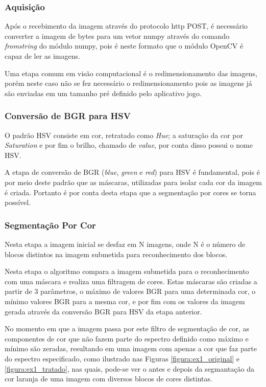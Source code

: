     \subsubsection{Aquisição}
    
    Após o recebimento da imagem através do protocolo http POST, é necessário converter a imagem de bytes para um vetor numpy através do comando \textit{fromstring} do módulo numpy, pois é neste formato que o módulo OpenCV é capaz de ler as imagens. 
    
    Uma etapa comum em visão computacional é o redimensionamento  das imagens, porém neste caso não se fez necessário o redimensionamento pois as imagens já são enviadas em um tamanho pré definido pelo aplicativo jogo.

    \subsubsection{Conversão de BGR para HSV}
    O padrão HSV consiste em cor, retratado como \textit{Hue}; a saturação da cor por \textit{Saturation} e por fim o brilho, chamado de \textit{value}, por conta disso possui o nome HSV.
    
    A etapa de conversão de BGR (\textit{blue}, \textit{green} e \textit{red}) para HSV é fundamental, pois é por meio deste padrão que as máscaras, utilizadas para isolar cada cor da imagem é criada. Portanto é por conta desta etapa que a segmentação por cores se torna possível.

    
    \subsubsection{Segmentação Por Cor}
    Nesta etapa a imagem inicial se desfaz em N imagens, onde N  é o número de blocos distintos na imagem submetida para reconhecimento dos blocos.
    
    Nesta etapa o algoritmo compara a imagem submetida para o reconhecimento com uma máscara e realiza uma filtragem de cores. Estas máscaras são criadas a partir de 3 parâmetros, o máximo de valores BGR para uma determinada cor, o mínimo valores BGR para a mesma cor, e por fim com os valores da imagem gerada através da conversão BGR para HSV da etapa anterior. 
    
    No momento em que a imagem passa por este filtro de segmentação de cor, as componentes de cor que não fazem parte do espectro definido como máximo e mínimo são zeradas, resultando em uma imagem com apenas a cor que faz parte do espectro especificado, como ilustrado nas Figuras \ref{figura:ex1_original} e \ref{figura:ex1_tratado}, nas quais, pode-se ver o antes e depois da segmantação da cor laranja de uma imagem com diversos blocos de cores distintas.
    
